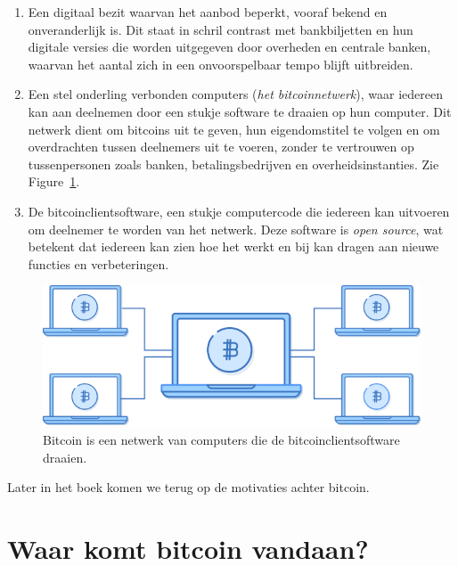 \documentclass[
  letterpaper,
]{scrbook}
\begin{document}
\begin{enumerate}
\def\labelenumi{\arabic{enumi}.}
\item
  Een digitaal bezit waarvan het aanbod beperkt, vooraf bekend en
  onveranderlijk is. Dit staat in schril contrast met bankbiljetten en
  hun digitale versies die worden uitgegeven door overheden en centrale
  banken, waarvan het aantal zich in een onvoorspelbaar tempo blijft
  uitbreiden.
\item
  Een stel onderling verbonden computers (\emph{het bitcoinnetwerk}),
  waar iedereen kan aan deelnemen door een stukje software te draaien op
  hun computer. Dit netwerk dient om bitcoins uit te geven, hun
  eigendomstitel te volgen en om overdrachten tussen deelnemers uit te
  voeren, zonder te vertrouwen op tussenpersonen zoals banken,
  betalingsbedrijven en overheidsinstanties. Zie
  Figure~\ref{fig-bitcoinnetwerk}.
\item
  De bitcoinclientsoftware, een stukje computercode die iedereen kan
  uitvoeren om deelnemer te worden van het netwerk. Deze software is
  \emph{open source}, wat betekent dat iedereen kan zien hoe het werkt
  en bij kan dragen aan nieuwe functies en verbeteringen.
\end{enumerate}

\begin{figure}

{\centering \includegraphics{./images/fig1.png}

}

\caption{\label{fig-bitcoinnetwerk}Bitcoin is een netwerk van computers
die de bitcoinclientsoftware draaien.}

\end{figure}

Later in het boek komen we terug op de motivaties achter bitcoin.

\hypertarget{waar-komt-bitcoin-vandaan}{%
\section{Waar komt bitcoin vandaan?}\label{waar-komt-bitcoin-vandaan}}
\end{document}
